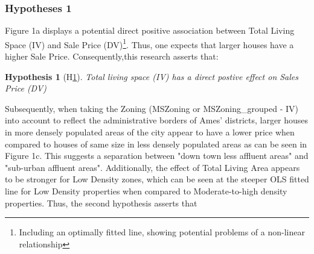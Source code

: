 \documentclass[a4paper]{article}
\newtheorem{hyp}{Hypothesis}
\begin{document}
\subsubsection{Hypotheses 1}

\begin{center}
\end{center}

\indent Figure 1a displays a potential direct positive association between Total Living Space (IV) and Sale Price (DV)\footnote{Including an optimally fitted line, showing potential problems of a non-linear relationship}. Thus, one expects that larger houses have a higher Sale Price. Consequently,this research asserts that:

\begin{hyp}[H\ref{hyp:first}] \label{hyp:first}
Total living space (IV) has a direct postive effect on Sales Price (DV)
\end{hyp}

\begin{center}
\end{center}

\indent Subsequently, when taking the Zoning (MSZoning or MSZoning\_grouped - IV) into account to reflect the administrative borders of Ames' districts, larger houses in more densely populated areas of the city appear to have a lower price when compared to houses of same size in less densely populated areas as can be seen in Figure 1c. This suggests a separation between "down town less affluent areas" and "sub-urban affluent areas". Additionally, the effect of Total Living Area appears to be stronger for Low Density zones, which can be seen at the steeper OLS fitted line for Low Density properties when compared to Moderate-to-high density properties. Thus, the second hypothesis asserts that
\end{document}

